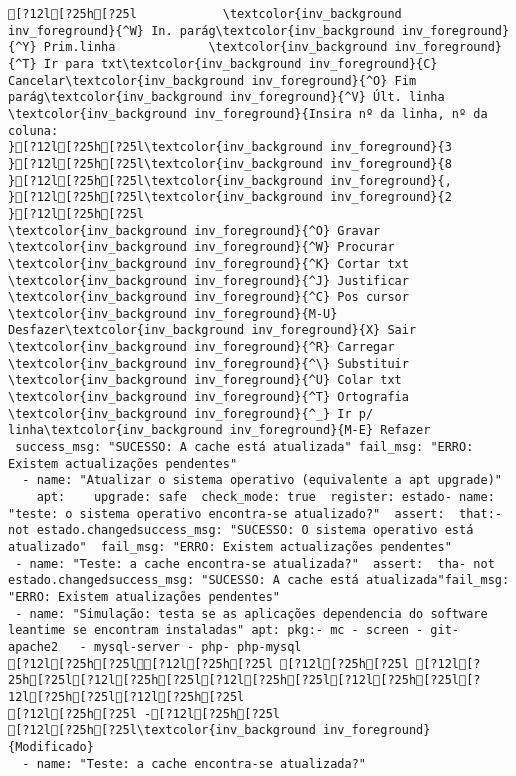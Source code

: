 \documentclass{scrartcl}
\begin{document}
\begin{Verbatim}
[?12l[?25h[?25l            \textcolor{inv_background inv_foreground}{^W} In. parág\textcolor{inv_background inv_foreground}{^Y} Prim.linha             \textcolor{inv_background inv_foreground}{^T} Ir para txt\textcolor{inv_background inv_foreground}{C} Cancelar\textcolor{inv_background inv_foreground}{^O} Fim parág\textcolor{inv_background inv_foreground}{^V} Últ. linha
\textcolor{inv_background inv_foreground}{Insira nº da linha, nº da coluna:                                                                       }[?12l[?25h[?25l\textcolor{inv_background inv_foreground}{3
}[?12l[?25h[?25l\textcolor{inv_background inv_foreground}{8
}[?12l[?25h[?25l\textcolor{inv_background inv_foreground}{,
}[?12l[?25h[?25l\textcolor{inv_background inv_foreground}{2
}[?12l[?25h[?25l
\textcolor{inv_background inv_foreground}{^O} Gravar     \textcolor{inv_background inv_foreground}{^W} Procurar   \textcolor{inv_background inv_foreground}{^K} Cortar txt \textcolor{inv_background inv_foreground}{^J} Justificar \textcolor{inv_background inv_foreground}{^C} Pos cursor \textcolor{inv_background inv_foreground}{M-U} Desfazer\textcolor{inv_background inv_foreground}{X} Sair       \textcolor{inv_background inv_foreground}{^R} Carregar   \textcolor{inv_background inv_foreground}{^\} Substituir \textcolor{inv_background inv_foreground}{^U} Colar txt  \textcolor{inv_background inv_foreground}{^T} Ortografia \textcolor{inv_background inv_foreground}{^_} Ir p/ linha\textcolor{inv_background inv_foreground}{M-E} Refazer
 success_msg: "SUCESSO: A cache está atualizada" fail_msg: "ERRO: Existem actualizações pendentes"
  - name: "Atualizar o sistema operativo (equivalente a apt upgrade)"
    apt:    upgrade: safe  check_mode: true  register: estado- name: "teste: o sistema operativo encontra-se atualizado?"  assert:  that:- not estado.changedsuccess_msg: "SUCESSO: O sistema operativo está atualizado"  fail_msg: "ERRO: Existem actualizações pendentes"
 - name: "Teste: a cache encontra-se atualizada?"  assert:  tha- not estado.changedsuccess_msg: "SUCESSO: A cache está atualizada"fail_msg: "ERRO: Existem atualizações pendentes"
 - name: "Simulação: testa se as aplicações dependencia do software leantime se encontram instaladas" apt: pkg:- mc - screen - git- apache2   - mysql-server - php- php-mysql
[?12l[?25h[?25l[?12l[?25h[?25l [?12l[?25h[?25l [?12l[?25h[?25l[?12l[?25h[?25l[?12l[?25h[?25l[?12l[?25h[?25l[?12l[?25h[?25l[?12l[?25h[?25l
[?12l[?25h[?25l -[?12l[?25h[?25l
[?12l[?25h[?25l\textcolor{inv_background inv_foreground}{Modificado}
  - name: "Teste: a cache encontra-se atualizada?"

\end{Verbatim}
\end{document}
